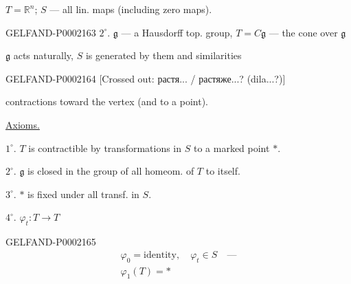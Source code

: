 $T=\mathbb R^n$; $S$ --- all lin. maps (including zero maps).



\begin{GelfandAdjacentEvidence}{GELFAND-P000216}{3}
$2^{\circ}$. $\mathfrak g$ --- a Hausdorff top. group, $T=C\mathfrak g$ --- the cone over $\mathfrak g$







\end{GelfandAdjacentEvidence}

$\mathfrak g$ acts naturally, $S$ is generated by them and similarities



\begin{GelfandAdjacentEvidence}{GELFAND-P000216}{4}
[Crossed out: растя... / растяже...? (dila...?)]
\end{GelfandAdjacentEvidence}

contractions toward the vertex (and to a point).



\underline{Axioms.}



$1^{\circ}$. $T$ is contractible by transformations in $S$ to a marked point $\ast$.



$2^{\circ}$. $\mathfrak g$ is closed in the group of all homeom. of $T$ to itself.



$3^{\circ}$. $\ast$ is fixed under all transf. in $S$.



$4^{\circ}$. $\varphi_t: T\longrightarrow T$



\begin{GelfandAdjacentEvidence}{GELFAND-P000216}{5}
\begin{equation*}\begin{gathered}\varphi_0=\text{identity},\quad\varphi_t\in S\quad\text{---}\\\varphi_1(T)=\ast\end{gathered}\end{equation*}
\end{GelfandAdjacentEvidence}

